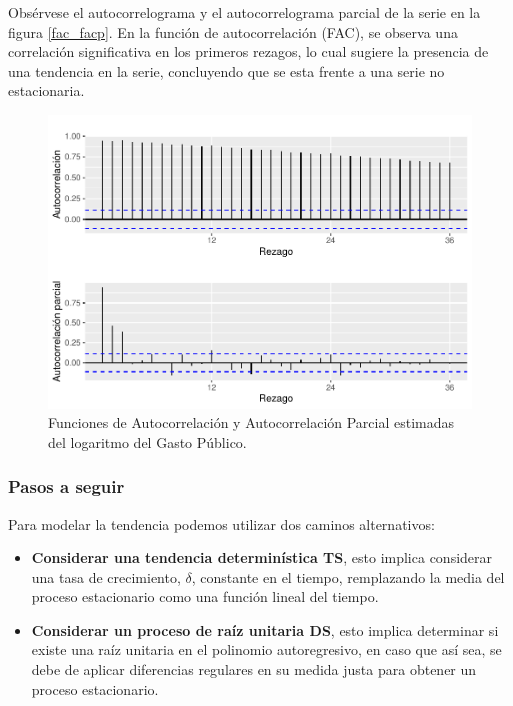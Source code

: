\documentclass[
  12pt,
]{article}
\begin{document}
Obsérvese el autocorrelograma y el autocorrelograma parcial de la serie
en la figura \ref{fac_facp}. En la función de autocorrelación (FAC), se
observa una correlación significativa en los primeros rezagos, lo cual
sugiere la presencia de una tendencia en la serie, concluyendo que se
esta frente a una serie no estacionaria.

\begin{figure}[H]

{\centering \includegraphics[width=0.75\linewidth]{informe_files/figure-latex/unnamed-chunk-1-1} 

}

\caption{\label{fac_facp} Funciones de Autocorrelación y Autocorrelación Parcial estimadas del logaritmo del Gasto Público.}\label{fig:unnamed-chunk-1}
\end{figure}

\hypertarget{pasos-a-seguir}{%
\subsubsection{Pasos a seguir}\label{pasos-a-seguir}}

Para modelar la tendencia podemos utilizar dos caminos alternativos:

\begin{itemize}
\item
  \textbf{Considerar una tendencia determinística TS}, esto implica
  considerar una tasa de crecimiento, \(\delta\), constante en el
  tiempo, remplazando la media del proceso estacionario como una función
  lineal del tiempo.
\item
  \textbf{Considerar un proceso de raíz unitaria DS}, esto implica
  determinar si existe una raíz unitaria en el polinomio autoregresivo,
  en caso que así sea, se debe de aplicar diferencias regulares en su
  medida justa para obtener un proceso estacionario.
\end{itemize}
\end{document}
